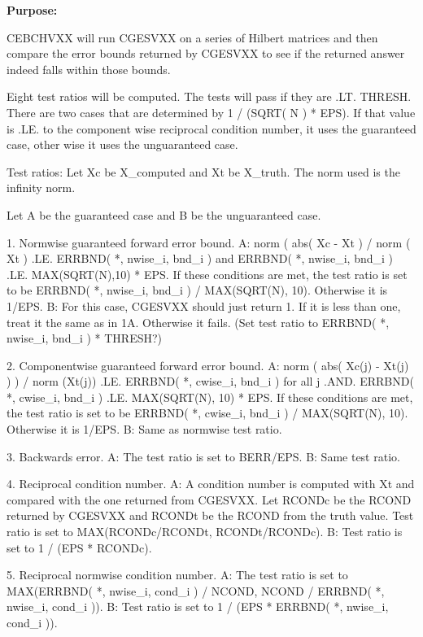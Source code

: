 {\bfseries Purpose\+:} \begin{DoxyVerb}  CEBCHVXX will run CGESVXX on a series of Hilbert matrices and then
  compare the error bounds returned by CGESVXX to see if the returned
  answer indeed falls within those bounds.

  Eight test ratios will be computed.  The tests will pass if they are .LT.
  THRESH.  There are two cases that are determined by 1 / (SQRT( N ) * EPS).
  If that value is .LE. to the component wise reciprocal condition number,
  it uses the guaranteed case, other wise it uses the unguaranteed case.

  Test ratios:
     Let Xc be X_computed and Xt be X_truth.
     The norm used is the infinity norm.

     Let A be the guaranteed case and B be the unguaranteed case.

       1. Normwise guaranteed forward error bound.
       A: norm ( abs( Xc - Xt ) / norm ( Xt ) .LE. ERRBND( *, nwise_i, bnd_i ) and
          ERRBND( *, nwise_i, bnd_i ) .LE. MAX(SQRT(N),10) * EPS.
          If these conditions are met, the test ratio is set to be
          ERRBND( *, nwise_i, bnd_i ) / MAX(SQRT(N), 10).  Otherwise it is 1/EPS.
       B: For this case, CGESVXX should just return 1.  If it is less than
          one, treat it the same as in 1A.  Otherwise it fails. (Set test
          ratio to ERRBND( *, nwise_i, bnd_i ) * THRESH?)

       2. Componentwise guaranteed forward error bound.
       A: norm ( abs( Xc(j) - Xt(j) ) ) / norm (Xt(j)) .LE. ERRBND( *, cwise_i, bnd_i )
          for all j .AND. ERRBND( *, cwise_i, bnd_i ) .LE. MAX(SQRT(N), 10) * EPS.
          If these conditions are met, the test ratio is set to be
          ERRBND( *, cwise_i, bnd_i ) / MAX(SQRT(N), 10).  Otherwise it is 1/EPS.
       B: Same as normwise test ratio.

       3. Backwards error.
       A: The test ratio is set to BERR/EPS.
       B: Same test ratio.

       4. Reciprocal condition number.
       A: A condition number is computed with Xt and compared with the one
          returned from CGESVXX.  Let RCONDc be the RCOND returned by CGESVXX
          and RCONDt be the RCOND from the truth value.  Test ratio is set to
          MAX(RCONDc/RCONDt, RCONDt/RCONDc).
       B: Test ratio is set to 1 / (EPS * RCONDc).

       5. Reciprocal normwise condition number.
       A: The test ratio is set to
          MAX(ERRBND( *, nwise_i, cond_i ) / NCOND, NCOND / ERRBND( *, nwise_i, cond_i )).
       B: Test ratio is set to 1 / (EPS * ERRBND( *, nwise_i, cond_i )).


\end{DoxyVerb}
